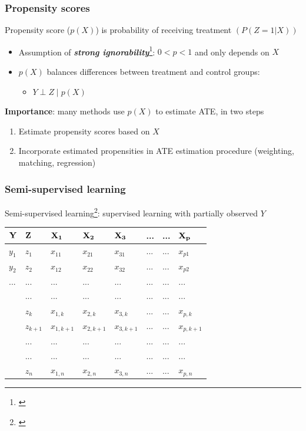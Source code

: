 \documentclass[compress]{beamer}
\begin{document}
\begin{frame} \frametitle{Propensity scores}
Propensity score ($p(X)$) is probability of receiving treatment $(P(Z = 1 | X))$
 \begin{itemize}
  \item Assumption of \textit{\textbf{strong ignorability}}\footnote[frame]{\cite{rosenbaum1983central}}: $0 < p < 1$ and only depends on $X$
  \item $p(X)$ balances differences between treatment and control groups:
  \begin{itemize}
	\item $Y \perp Z \; | \; p(X)$
  \end{itemize}
 \end{itemize}

\pause 

\bigskip
\bigskip
\bigskip

\textbf{Importance}: many methods use $p(X)$ to estimate ATE, in two steps
  \begin{enumerate}
	\item Estimate propensity scores based on $X$
	\item Incorporate estimated propensities in ATE estimation procedure (weighting, matching, regression)
  \end{enumerate}

\transboxin
\end{frame}


\begin{frame} \frametitle{Semi-supervised learning}
Semi-supervised learning\footnote[frame]{\cite{liang2007use}}: supervised learning with 
partially observed $Y$

\medskip
\begin{center}
\begin{tabular}{ |p{1cm}|p{1cm}|p{1cm}|p{1cm}|p{1cm}|p{1cm}|p{1cm}|p{1cm}|  }
\hline
${\bf Y}$ & ${\bf Z}$ & ${\bf X_1}$ & ${\bf X_2}$ & ${\bf X_3}$ & ... & ... & ${\bf X_p}$ \\
\hline
$y_1$ & $z_1$ & $x_{11}$ & $x_{21}$ & $x_{31}$ & ... & ... & $x_{p1}$ \\
$y_2$ & $z_2$ & $x_{12}$ & $x_{22}$ & $x_{32}$ & ... & ... & $x_{p2}$ \\
... & ... & ... & ... & ... & ... & ... & ... \\
\hline
\cellcolor{lightgray} & ... & ... & ... & ... & ... & ... & ... \\
\cellcolor{lightgray} & $z_k$ & $x_{1, k}$ & $x_{2, k}$ & $x_{3, k}$ & ... & ... & $x_{p, k}$ \\
\cellcolor{lightgray} & $z_{k+1}$ & $x_{1, k+1}$ & $x_{2, k+1}$ & $x_{3, k+1}$ & ... & ... & $x_{p, k+1}$ \\
\cellcolor{lightgray} & ... & ... & ... & ... & ... & ... & ... \\
\cellcolor{lightgray} & ... & ... & ... & ... & ... & ... & ... \\
\cellcolor{lightgray} & $z_{n}$ & $x_{1, n}$ & $x_{2, n}$ & $x_{3, n}$ & ... & ... & $x_{p, n}$ \\
\hline
\end{tabular}
\end{center}

\transboxin
\end{frame}
\end{document}
